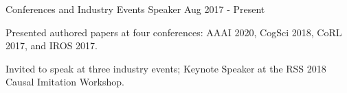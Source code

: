 


\begin{cventries}

\cventry
{Conferences and Industry Events}
{Speaker}
{}
{Aug 2017 - Present}
{
\begin{cvitems}
  \item Presented authored papers at four conferences: AAAI 2020, CogSci 2018, CoRL 2017, and IROS 2017.
  \item Invited to speak at three industry events; Keynote Speaker at the RSS 2018 Causal Imitation Workshop.
\end{cvitems}
}


\end{cventries}